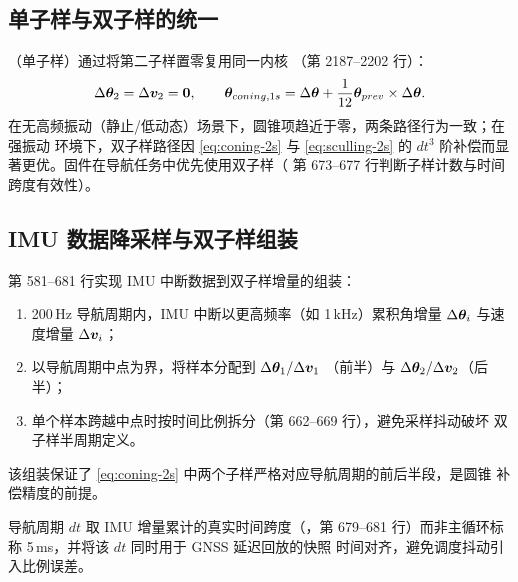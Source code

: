 \subsection{单子样与双子样的统一}

（单子样）通过将第二子样置零复用同一内核
（第 2187--2202 行）：
\begin{equation}
  \Delta\boldsymbol{\theta}_2 = \Delta\boldsymbol{v}_2 = \boldsymbol{0},
  \qquad
  \boldsymbol{\theta}_{coning,1s} = \Delta\boldsymbol{\theta}
    + \frac{1}{12}\boldsymbol{\theta}_{prev}\times\Delta\boldsymbol{\theta}.
  \label{eq:single-sample-reduce}
\end{equation}
在无高频振动（静止/低动态）场景下，圆锥项趋近于零，两条路径行为一致；在强振动
环境下，双子样路径因 \cref{eq:coning-2s} 与 \cref{eq:sculling-2s} 的
$dt^3$ 阶补偿而显著更优。固件在导航任务中优先使用双子样（
第 673--677 行判断子样计数与时间跨度有效性）。

\subsection{IMU 数据降采样与双子样组装}

 第 581--681 行实现 IMU 中断数据到双子样增量的组装：
\begin{enumerate}
  \item 200\,Hz 导航周期内，IMU 中断以更高频率（如 1\,kHz）累积角增量
    $\Delta\boldsymbol{\theta}_{i}$ 与速度增量 $\Delta\boldsymbol{v}_{i}$；
  \item 以导航周期中点为界，将样本分配到 $\Delta\boldsymbol{\theta}_1/\Delta\boldsymbol{v}_1$
    （前半）与 $\Delta\boldsymbol{\theta}_2/\Delta\boldsymbol{v}_2$（后半）；
  \item 单个样本跨越中点时按时间比例拆分（第 662--669 行），避免采样抖动破坏
    双子样半周期定义。
\end{enumerate}
该组装保证了 \cref{eq:coning-2s} 中两个子样严格对应导航周期的前后半段，是圆锥
补偿精度的前提。

\begin{remark}
导航周期 $dt$ 取 IMU 增量累计的真实时间跨度（，第
679--681 行）而非主循环标称 5\,ms，并将该 $dt$ 同时用于 GNSS 延迟回放的快照
时间对齐，避免调度抖动引入比例误差。
\end{remark}

